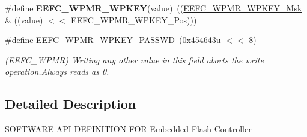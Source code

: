 \begin{DoxyCompactItemize}
\mbox{\label{group__SAME70__EFC_ga9f22a162b2b843aa457003a172178e44}} 
\#define {\bfseries E\+E\+F\+C\+\_\+\+W\+P\+M\+R\+\_\+\+W\+P\+K\+EY}(value)~((\mbox{\hyperlink{group__SAMV71__EFC_ga6d0a055ac41342fef0fc0fde79d40879}{E\+E\+F\+C\+\_\+\+W\+P\+M\+R\+\_\+\+W\+P\+K\+E\+Y\+\_\+\+Msk}} \& ((value) $<$$<$ E\+E\+F\+C\+\_\+\+W\+P\+M\+R\+\_\+\+W\+P\+K\+E\+Y\+\_\+\+Pos)))
\item 
\mbox{\label{group__SAME70__EFC_gabcb88b0cdf5f0c55f51b950f101dcfbb}} 
\#define \mbox{\hyperlink{group__SAME70__EFC_gabcb88b0cdf5f0c55f51b950f101dcfbb}{E\+E\+F\+C\+\_\+\+W\+P\+M\+R\+\_\+\+W\+P\+K\+E\+Y\+\_\+\+P\+A\+S\+S\+WD}}~(0x454643u $<$$<$ 8)
\begin{DoxyCompactList}\small\item\em (E\+E\+F\+C\+\_\+\+W\+P\+MR) Writing any other value in this field aborts the write operation.\+Always reads as 0. \end{DoxyCompactList}\end{DoxyCompactItemize}


\subsection{Detailed Description}
S\+O\+F\+T\+W\+A\+RE A\+PI D\+E\+F\+I\+N\+I\+T\+I\+ON F\+OR Embedded Flash Controller 